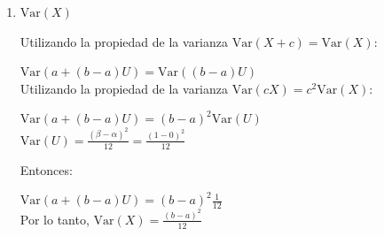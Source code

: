 \documentclass[11pt,a4paper]{report}
\begin{document}
\begin{enumerate}
{\begin{enumerate}
{					Utilizando la propiedad de la exponencial $\mathbb{E}(cx) = c\mathbb{E}(X)$:

					$\mathbb{E}(a+(b - a)U) = a + (b - a)\mathbb{E}(U)$\\

					$\mathbb{E}(U) = \frac{\beta + \alpha}{2} = \frac{1+0}{2}$

					Entonces:

					$\mathbb{E}(a+(b - a)U) = a + (b - a)\frac{1}{2} = \frac{1}{2}(a+b)$\\


					Por lo tanto, $\mathbb{E}(X) = \frac{a+b}{2}$\\


				}

				\item {
					$\text{Var}(X)$

					Utilizando la propiedad de la varianza $\text{Var}(X + c) = \text{Var}(X)$:

					$\text{Var}(a+(b - a)U) = \text{Var}((b - a)U)$\\

					Utilizando la propiedad de la varianza $\text{Var}(cX) = c^2\text{Var}(X)$:

					$\text{Var}(a+(b - a)U) = (b - a)^2 \text{Var}(U)$\\


					$\text{Var}(U) = \frac{(\beta - \alpha)^2}{12} = \frac{(1-0)^2}{12}$

					Entonces:

					$\text{Var}(a+(b - a)U) = (b - a)^2\frac{1}{12}$ \\


					Por lo tanto, $\text{Var}(X) = \frac{(b - a)^2}{12}$ \\
				}
			\end{enumerate}
			}
	\end{enumerate}
\end{document}
